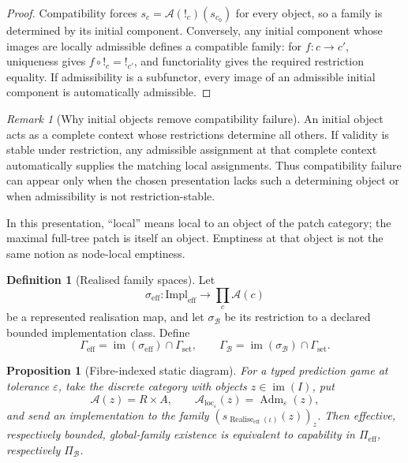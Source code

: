 \documentclass[11pt]{article}
\theoremstyle{plain}
\newtheorem{proposition}[theorem]{Proposition}
\theoremstyle{definition}
\newtheorem{definition}[theorem]{Definition}
\theoremstyle{remark}
\newtheorem{remark}[theorem]{Remark}
\newcommand{\im}{\operatorname{im}}
\newcommand{\Adm}{\operatorname{Adm}}
\newcommand{\realise}{\operatorname{Realise}}
\newcommand{\LocalAdm}{\mathcal{A}_{\mathrm{loc}}}
\newcommand{\eps}{\varepsilon}
\begin{document}
\begin{proof}
Compatibility forces $s_c=\mathcal A(!_c)(s_{c_0})$ for every object, so a
family is determined by its initial component. Conversely, any initial component
whose images are locally admissible defines a compatible family: for
$f:c\to c'$, uniqueness gives $f\circ !_c=!_{c'}$, and functoriality gives the
required restriction equality. If admissibility is a subfunctor, every image of
an admissible initial component is automatically admissible.
\end{proof}

\begin{remark}[Why initial objects remove compatibility failure]
An initial object acts as a complete context whose restrictions determine all
others. If validity is stable under restriction, any admissible assignment at
that complete context automatically supplies the matching local assignments.
Thus compatibility failure can appear only when the chosen presentation lacks
such a determining object or when admissibility is not restriction-stable.
\end{remark}

In this presentation, ``local'' means local to an object of the patch category;
the maximal full-tree patch is itself an object. Emptiness at that object is not
the same notion as node-local emptiness.

\begin{definition}[Realised family spaces]\label{def:ECD}
Let
\[
\sigma_{\mathrm{eff}}:\mathrm{Impl}_{\mathrm{eff}}
\to\prod_c\mathcal A(c)
\]
be a represented realisation map, and let $\sigma_{\mathcal B}$ be its
restriction to a declared bounded implementation class. Define
\[
\Gamma_{\mathrm{eff}}
=\im(\sigma_{\mathrm{eff}})\cap\Gamma_{\mathrm{set}},
\qquad
\Gamma_{\mathcal B}
=\im(\sigma_{\mathcal B})\cap\Gamma_{\mathrm{set}}.
\]
\end{definition}



\begin{proposition}[Fibre-indexed static diagram]\label{prop:fibre-diagram}
For a typed prediction game at tolerance $\eps$, take the discrete category with
objects $z\in\im(I)$, put
\[
\mathcal A(z)=R\times A,
\qquad
\LocalAdm_\eps(z)=\Adm_\eps(z),
\]
and send an implementation to the family
$(s_{\realise_{\mathrm{eff}}(\iota)}(z))_z$. Then effective, respectively
bounded, global-family existence is equivalent to capability in
$\Pi_{\mathrm{eff}}$, respectively $\Pi_{\mathcal B}$.
\end{proposition}
\end{document}
